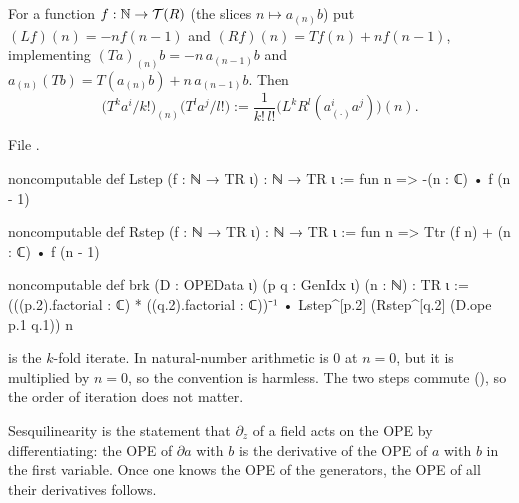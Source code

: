 \begin{definition}\label{l11:def:brk}
For a function $f:{\mathbb{N}}\to\mathcal T(R)$ (the slices $n\mapsto a_{(n)}b$) put $(L f)(n) = -n f(n-1)$ and
$(R f)(n) = T f(n)+n f(n-1)$, implementing $(Ta)_{(n)}b = -n\,a_{(n-1)}b$ and $a_{(n)}(Tb) = T(a_{(n)}b)+n\,a_{(n-1)}b$. Then
\begin{equation*}
\bigl(T^ka^i/k!\bigr)_{(n)}\bigl(T^la^j/l!\bigr) := \frac1{k!\,l!}\bigl(L^kR^l(a^i_{(\cdot)}a^j)\bigr)(n).
\end{equation*}
\end{definition}
\noindent File .
\begin{leancode}
noncomputable def Lstep (f : ℕ → TR ι) : ℕ → TR ι := fun n => -(n : ℂ) • f (n - 1)

noncomputable def Rstep (f : ℕ → TR ι) : ℕ → TR ι := fun n => Ttr (f n) + (n : ℂ) • f (n - 1)

noncomputable def brk (D : OPEData ι) (p q : GenIdx ι) (n : ℕ) : TR ι :=
  (((p.2).factorial : ℂ) * ((q.2).factorial : ℂ))⁻¹ •
    Lstep^[p.2] (Rstep^[q.2] (D.ope p.1 q.1)) n
\end{leancode}

\begin{dictionary}
 is the $k$-fold iterate. In natural-number arithmetic  is $0$ at $n=0$, but it is multiplied
by $n = 0$, so the convention is harmless. The two steps commute (), so the order of iteration does not
matter.
\end{dictionary}

\begin{physics}
Sesquilinearity is the statement that $\partial_z$ of a field acts on the OPE by differentiating: the OPE of $\partial a$ with $b$
is the derivative of the OPE of $a$ with $b$ in the first variable. Once one knows the OPE of the generators, the OPE of all
their derivatives follows.
\end{physics}

